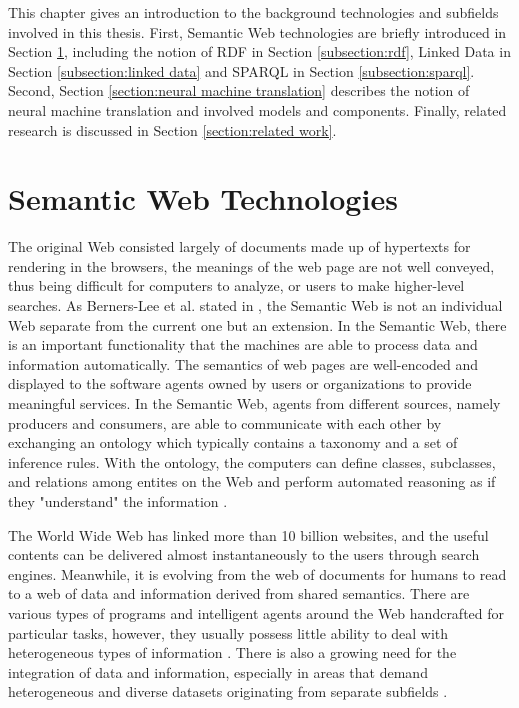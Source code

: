 
This chapter gives an introduction to the background technologies and subfields involved in this thesis. First, Semantic Web technologies are briefly introduced in Section \ref{section:semantic web technologies}, including the notion of RDF in Section \ref{subsection:rdf}, Linked Data in Section \ref{subsection:linked data} and SPARQL in Section \ref{subsection:sparql}. Second, Section \ref{section:neural machine translation} describes the notion of neural machine translation and involved models and components. Finally, related research is discussed in Section \ref{section:related work}.

\section{Semantic Web Technologies} \label{section:semantic web technologies}

The original Web consisted largely of documents made up of hypertexts for rendering in the browsers, the meanings of the web page are not well conveyed, thus being difficult for computers to analyze, or users to make higher-level searches. As Berners-Lee et al. stated in \cite{Berners-Lee2001}, the Semantic Web is not an individual Web separate from the current one but an extension. In the Semantic Web, there is an important functionality that the machines are able to process data and information automatically. The semantics of web pages are well-encoded and displayed to the software agents owned by users or organizations to provide meaningful services. In the Semantic Web, agents from different sources, namely producers and consumers, are able to communicate with each other by exchanging an ontology which typically contains a taxonomy and a set of inference rules. With the ontology, the computers can define classes, subclasses, and relations among entites on the Web and perform automated reasoning as if they "understand" the information \cite{Berners-Lee2001}.

The World Wide Web has linked more than 10 billion websites, and the useful contents can be delivered almost instantaneously to the users through search engines. Meanwhile, it is evolving from the web of documents for humans to read to a web of data and information derived from shared semantics. There are various types of programs and intelligent agents around the Web handcrafted for particular tasks, however, they usually possess little ability to deal with heterogeneous types of information \cite{Shadbolt2006}. There is also a growing need for the integration of data and information, especially in areas that demand heterogeneous and diverse datasets originating from separate subfields \cite{Shadbolt2006}.

